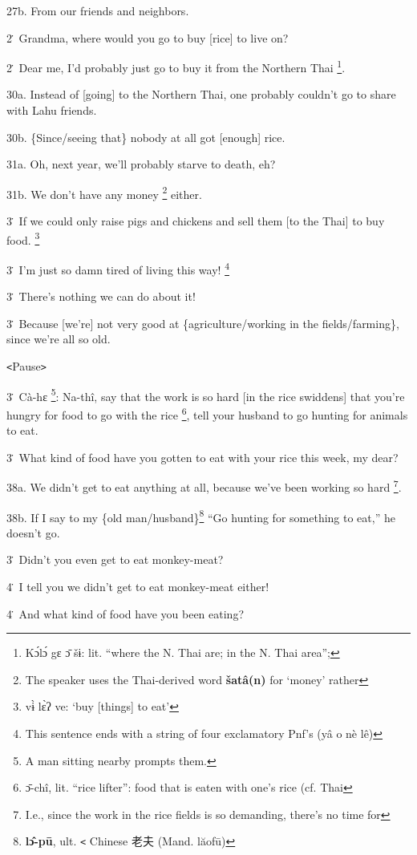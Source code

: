 27b. From our friends and neighbors.

2\. Grandma, where would you go to buy [rice] to live on?

2\. Dear me, I'd probably just go to buy it from the Northern Thai \footnote{Kɔ́lɔ́ gɛ ɔ̄ šɨ: lit. ``where the N. Thai are; in the N. Thai area'';}.

30a. Instead of [going] to the Northern Thai, one probably couldn't go to share
with Lahu friends.

30b. \{Since/seeing that\} nobody at all got [enough] rice.

31a. Oh, next year, we'll probably starve to death, eh?

31b. We don't have any money \footnote{The speaker uses the Thai-derived word \textbf{šatâ(n)} for `money' rather} either.

3\. If we could only raise pigs and chickens and sell them [to the Thai] to buy
food. \footnote{vɨ̀ lɛ̀ʔ ve: `buy [things] to eat'}

3\. I'm just so damn tired of living this way! \footnote{This sentence ends with a string of four exclamatory Pnf's (yâ o nè lê)}

3\. There's nothing we can do about it!

3\. Because [we're] not very good at \{agriculture/working in the fields/farming\},
since we're all so old.

\texttt{<}Pause\texttt{>}

3\. Cà-hɛ \footnote{A man sitting nearby prompts them.}: Na-thî, say that the work is so hard [in the rice swiddens]
that you're hungry for food to go with the rice \footnote{ɔ̄-chî, lit. ``rice lifter'': food that is eaten with one's rice (cf. Thai}, tell your husband to go hunting
for animals to eat.

3\. What kind of food have you gotten to eat with your rice this week, my dear?

38a. We didn't get to eat anything at all, because we've been working so hard \footnote{I.e., since the work in the rice fields is so demanding, there's no time for}.

38b. If I say to my \{old man/husband\}\footnote{\textbf{lɔ̂-pū}, ult. \texttt{<} Chinese 老夫 (Mand. lăofū)} ``Go hunting for something to eat,''
he doesn't go.

3\. Didn't you even get to eat monkey-meat?

4\. I tell you we didn't get to eat monkey-meat either!

4\. And what kind of food have you been eating?

